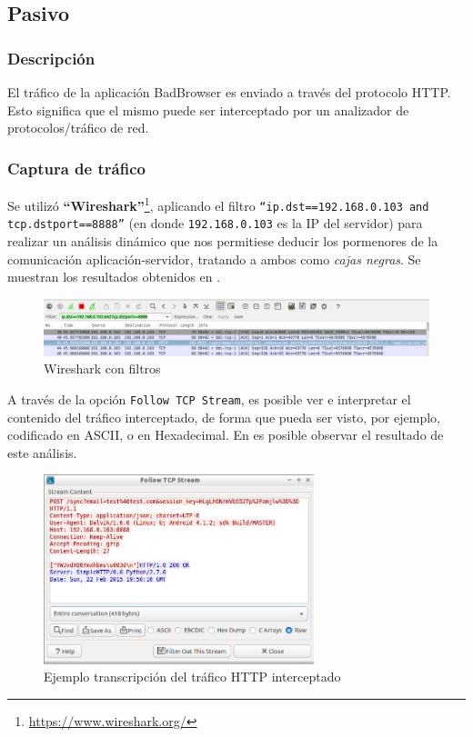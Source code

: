 \documentclass[11pt, a4paper, twoside]{article}
\begin{document}
\subsection{Pasivo}
\subsubsection{Descripción}
El tráfico de la aplicación BadBrowser es enviado a través del protocolo HTTP. Esto significa que el mismo puede ser interceptado por un analizador de protocolos/tráfico de red. 

\subsubsection{Captura de tráfico}
Se utilizó \textbf{``Wireshark''}\footnote{\url{https://www.wireshark.org/}}, aplicando el filtro \texttt{``ip.dst==192.168.0.103 and tcp.dstport==8888''} (en donde \texttt{192.168.0.103} es la IP del servidor) para realizar un análisis dinámico que nos permitiese deducir los pormenores de la comunicación aplicación-servidor, tratando a ambos como \emph{cajas negras}. Se muestran los resultados obtenidos en .

\begin{center}
\begin{figure}[H]
\includegraphics[width=\textwidth]{wireshark-filtro.png}
\caption{Wireshark con filtros}
\label{fig:wireshark-filtro}
\end{figure}
\end{center}

A través de la opción \texttt{Follow TCP Stream}, es posible ver e interpretar el contenido del tráfico interceptado, de forma que pueda ser visto, por ejemplo, codificado en ASCII, o en Hexadecimal. En  es posible observar el resultado de este análisis.

\begin{figure}[H]
\begin{center}
\includegraphics[width=0.7\textwidth]{wireshark-followstream.png}
\end{center}
\caption{Ejemplo transcripción del tráfico HTTP interceptado}
\label{fig:wireshark-followstream}
\end{figure}
\end{document}
